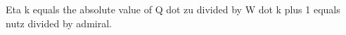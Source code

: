 Eta k equals the absolute value of Q dot zu divided by W dot k plus 1 equals nutz divided by admiral.